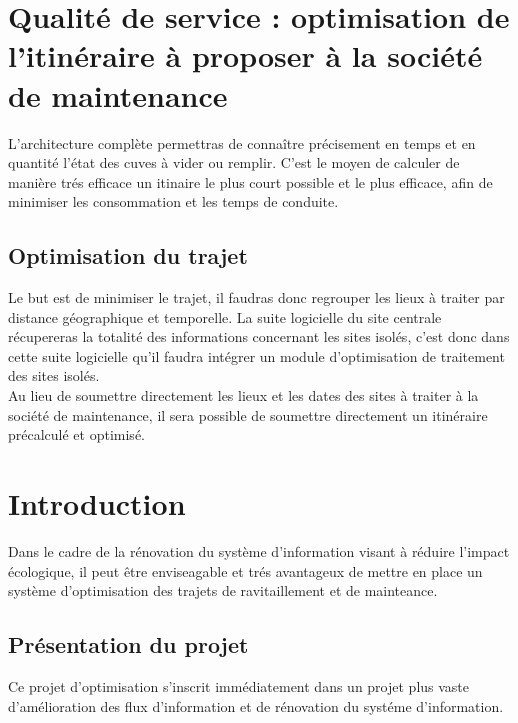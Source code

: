 
\section{Qualité de service : optimisation de l'itinéraire à proposer à la société de maintenance}

    L'architecture complète permettras de connaître précisement en temps et en quantité l'état des cuves à vider ou remplir.
    C'est le moyen de calculer de manière trés efficace un itinaire le plus court possible et le plus efficace, afin de minimiser les consommation et les temps de conduite.
    
    \subsection{Optimisation du trajet}
        
        Le but est de minimiser le trajet, il faudras donc regrouper les lieux à traiter par distance géographique et temporelle.
        La suite logicielle du site centrale récupereras la totalité des informations concernant les sites isolés, c'est donc dans cette suite logicielle qu'il faudra intégrer un module d'optimisation de traitement des sites isolés.
        \\
        Au lieu de soumettre directement les lieux et les dates des sites à traiter à la société de maintenance, il sera possible de soumettre directement un itinéraire précalculé et optimisé.
        
        

\section{Introduction}

        Dans le cadre de la rénovation du système d'information visant à réduire l'impact écologique, il peut être enviseagable et trés avantageux de mettre en place un système d'optimisation des trajets de ravitaillement et de mainteance.

    \subsection{Présentation du projet}
    
        Ce projet d'optimisation s'inscrit immédiatement dans un projet plus vaste d'amélioration des flux d'information et de rénovation du systéme d'information.
        
